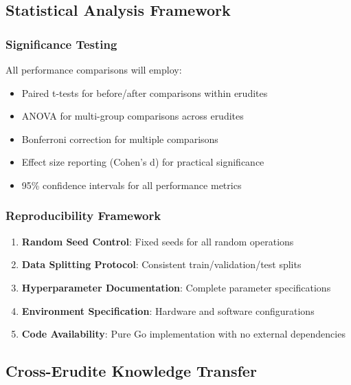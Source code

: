 \subsection{Statistical Analysis Framework}

\subsubsection{Significance Testing}

\begin{definition}
All performance comparisons will employ:
\begin{itemize}
    \item Paired t-tests for before/after comparisons within erudites
    \item ANOVA for multi-group comparisons across erudites
    \item Bonferroni correction for multiple comparisons
    \item Effect size reporting (Cohen's d) for practical significance
    \item 95\% confidence intervals for all performance metrics
\end{itemize}
\end{definition}

\subsubsection{Reproducibility Framework}

\begin{enumerate}
    \item \textbf{Random Seed Control}: Fixed seeds for all random operations
    \item \textbf{Data Splitting Protocol}: Consistent train/validation/test splits
    \item \textbf{Hyperparameter Documentation}: Complete parameter specifications
    \item \textbf{Environment Specification}: Hardware and software configurations
    \item \textbf{Code Availability}: Pure Go implementation with no external dependencies
\end{enumerate}

\subsection{Cross-Erudite Knowledge Transfer}

